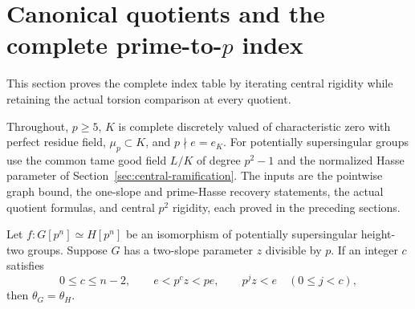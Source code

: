 \section{Canonical quotients and the complete prime-to-$p$ index}\label{sec:canonical-iteration}
This section proves the complete index table by iterating central rigidity while retaining the actual torsion comparison at every quotient.

Throughout, $p\ge5$, $K$ is complete discretely valued of characteristic zero with perfect residue field, $\mu_p\subset K$, and $p\nmid e=e_K$. For potentially supersingular groups use the common tame good field $L/K$ of degree $p^2-1$ and the normalized Hasse parameter of Section~\ref{sec:central-ramification}. The inputs are the pointwise graph bound, the one-slope and prime-Hasse recovery statements, the actual quotient formulas, and central $p^2$ rigidity, each proved in the preceding sections.

\begin{lemma}\label{ci-lem:iteration}
Let $f:G[p^n]\simeq H[p^n]$ be an isomorphism of potentially supersingular height-two groups. Suppose $G$ has a two-slope parameter $z$ divisible by $p$. If an integer $c$ satisfies
\[
 0\le c\le n-2,\qquad e<p^c z<pe,
 \qquad p^jz<e\quad(0\le j<c),
\]
then $\theta_G=\theta_H$.
\end{lemma}

